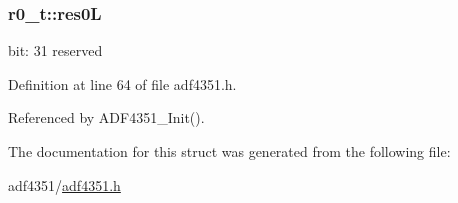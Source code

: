\subsubsection[{\texorpdfstring{res0L}{res0L}}]{ r0\+\_\+t\+::res0L}\hypertarget{structr0__t_ab7402e75c2a633ce378078407151341d}{}\label{structr0__t_ab7402e75c2a633ce378078407151341d}
bit\+: 31 reserved 

Definition at line 64 of file adf4351.\+h.



Referenced by A\+D\+F4351\+\_\+\+Init().



The documentation for this struct was generated from the following file\+:\begin{DoxyCompactItemize}
\item 
adf4351/\hyperlink{adf4351_8h}{adf4351.\+h}\end{DoxyCompactItemize}
